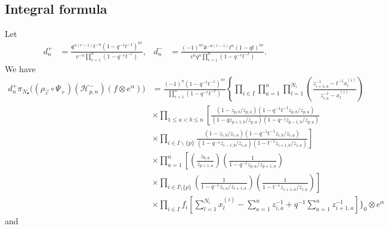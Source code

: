 \documentclass{amsart}
\newcommand{\qqq}{\mathfrak{q}}
\newcommand{\ddd}{\mathfrak{d}}
\theoremstyle{remark}
\numberwithin{thm}{section}
\numberwithin{equation}{section}
\begin{document}
\subsection{Integral formula}
Let
\begin{align*}
d_n^+&=\frac{\qqq^{n(r-1)}t^{-n}\left( 1-q^{-1}t^{-1} \right)^{nr}}{v^{-n}\prod_{r=1}^n\left( 1-q^{-r}t^{-r} \right)},&
d_n^-&= \frac{(-1)^{nr}\ddd^{-n(r-1)}t^{n}\left(1- qt \right)^{nr}}{v^nq^{n}\prod_{r=1}^n\left(1- q^{-r}t^{-r} \right)}.
\end{align*}
We have
\begin{align*}
d_n^+\pi_{N_\bullet}\biggl( \left( \rho_{\vec{c}}\circ\Psi_+ \right)(\mathcal{H}_{p,n}^-)(f\otimes e^\alpha)\biggr)
&=\frac{(-1)^n\left(1- q^{-1}t^{-1} \right)^{nr}}{\prod_{r=1}^n\left(1- q^{-r}t^{-r} \right)}
\left\{\prod_{i\in I}\prod_{a=1}^n\prod_{l=1}^{N_i}\left(\frac{ z_{i+1,a}^{-1}-t^{-1}x_{l}^{(i)} }{ z_{i,a}^{-1}-x_{l}^{(i)} }\right)\right.\\
&\times\prod_{1\le a<b\le n}
\left[
\frac{\left(1-z_{p,b}/z_{p,a}\right)\left(1-q^{-1}t^{-1}z_{p,b}/z_{p,a}\right)}{\left(1-qz_{p+1,b}/z_{p,a}\right)\left(1-q^{-1}z_{p-1,b}/z_{p,a}\right)}\right.\\
\nonumber
&\times\left.\prod_{i\in I\backslash\{p\}}
\frac{\left(1-z_{i,b}/z_{i,a}\right)\left(1-q^{-1}t^{-1}z_{i,b}/z_{i,a}\right)}{\left(1-q^{-1}z_{i-1,b}/z_{i,a}\right)\left(1-t^{-1}z_{i+1,b}/z_{i,a}\right)}\right]\\
&\times\prod_{a=1}^n \left[
\left(\frac{z_{0,a}}{z_{p+1,a}}\right)\left(\frac{1}{1-q^{-1}z_{p,a}/z_{p+1,a}}\right)\right.\\
\nonumber
&\times\left.
\prod_{i\in I\setminus\{p\}}
\left(\frac{1}{1-q^{-1}z_{i,a}/z_{i+1,a}}\right)
\left( \frac{1}{1-t^{-1}z_{i+1,a}/z_{i,a}} \right)\right]\\
&\times 
\prod_{i\in I}f_i\left[ \sum_{l=1}^{N_i}x_{l}^{(i)}-\sum_{a=1}^nz_{i,a}^{-1}+q^{-1}\sum_{a=1}^n z_{i+1,a}^{-1} \right]\Bigg\}_0\otimes e^\alpha 
\end{align*}
and
\end{document}
